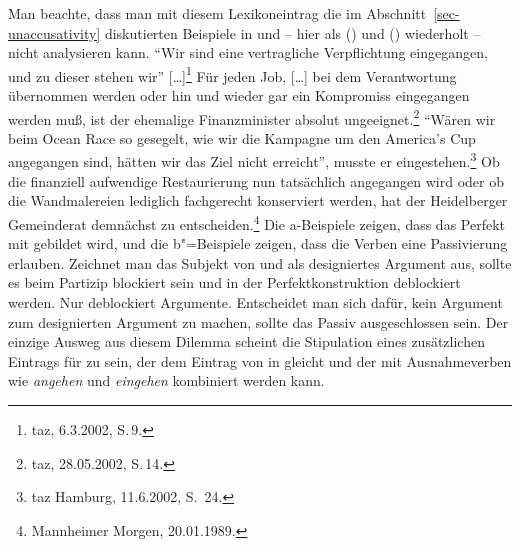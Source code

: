 Man beachte, dass man mit diesem Lexikoneintrag die im Abschnitt~\ref{sec-unaccusativity} 
diskutierten Beispiele in  und  --
hier als () und () wiederholt -- nicht analysieren kann. 
\eal
\label{bsp-eingegangen-all-zwei}
\ex{}
"`Wir sind eine vertragliche Verpflichtung eingegangen, und zu dieser stehen wir"' [\ldots]\footnote{
        taz, 6.3.2002, S.\,9.%
}
\ex\label{bsp-eingegangen-zwei}
Für jeden Job, [\ldots] bei dem Verantwortung übernommen werden oder hin und wieder gar
    ein Kompromiss eingegangen werden muß, ist der ehemalige Finanzminister absolut ungeeignet.\footnote{
        taz, 28.05.2002, S.\,14.%
    }
%
\zl
\eal
\label{bsp-angegangen-all-zwei}
\ex{}
"`Wären wir beim Ocean Race so gesegelt, wie wir die Kampagne um den America's Cup angegangen sind, 
hätten wir das Ziel nicht erreicht"', musste er eingestehen.\footnote{
        taz Hamburg, 11.6.2002, S.\, 24.%
}
%
\ex\label{bsp-angegangen-zwei}
Ob die finanziell
aufwendige Restaurierung nun tatsächlich angegangen wird oder ob die Wandmalereien lediglich fachgerecht konserviert werden, hat der
Heidelberger Gemeinderat demnächst zu entscheiden.\footnote{
        Mannheimer Morgen, 20.01.1989.%
}
\zl
Die a-Beispiele zeigen, dass das Perfekt mit \sein gebildet wird, und die b"=Beispiele zeigen, dass
die Verben eine Passivierung erlauben.
Zeichnet man das Subjekt von  und  
als designiertes Argument aus, sollte es beim Partizip blockiert sein und in der
Perfektkonstruktion deblockiert werden. Nur \haben deblockiert Argumente.
Entscheidet man sich dafür, kein Argument zum designierten Argument zu machen,
sollte das Passiv ausgeschlossen sein. Der einzige Ausweg aus diesem Dilemma
scheint die Stipulation eines zusätzlichen Eintrags für \sein zu sein,
der dem Eintrag von \haben in  gleicht und der 
mit Ausnahmeverben wie \emph{angehen} und \emph{eingehen} kombiniert werden kann.
\largerpage

